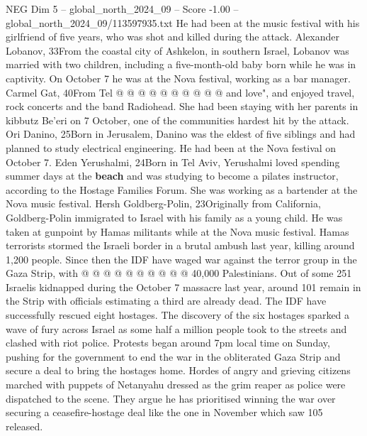 \begin{textsample}{NEG Dim 5 – global\_north\_2024\_09 – Score -1.00 – global\_north\_2024\_09/113597935.txt}
He had been at the music festival with his girlfriend of five years, who was shot and killed during the attack.
Alexander Lobanov, 33From the coastal city of Ashkelon, in southern Israel, Lobanov was married with two children, including a five-month-old baby born while he was in captivity.
On October 7 he was at the Nova festival, working as a bar manager.
Carmel Gat, 40From Tel @ @ @ @ @ @ @ @ @ @ and love", and enjoyed travel, rock concerts and the band Radiohead.
She had been staying with her parents in kibbutz Be'eri on 7 October, one of the communities hardest hit by the attack.
Ori Danino, 25Born in Jerusalem, Danino was the eldest of five siblings and had planned to study electrical engineering.
He had been at the Nova festival on October 7.
Eden Yerushalmi, 24Born in Tel Aviv, Yerushalmi loved spending summer days at the \textbf{beach} and was studying to become a pilates instructor, according to the Hostage Families Forum.
She was working as a bartender at the Nova music festival.
Hersh Goldberg-Polin, 23Originally from California, Goldberg-Polin immigrated to Israel with his family as a young child.
He was taken at gunpoint by Hamas militants while at the Nova music festival.
Hamas terrorists stormed the Israeli border in a brutal ambush last year, killing around 1,200 people.
Since then the IDF have waged war against the terror group in the Gaza Strip, with @ @ @ @ @ @ @ @ @ @ 40,000 Palestinians.
Out of some 251 Israelis kidnapped during the October 7 massacre last year, around 101 remain in the Strip with officials estimating a third are already dead.
The IDF have successfully rescued eight hostages.
The discovery of the six hostages sparked a wave of fury across Israel as some half a million people took to the streets and clashed with riot police.
Protests began around 7pm local time on Sunday, pushing for the government to end the war in the obliterated Gaza Strip and secure a deal to bring the hostages home.
Hordes of angry and grieving citizens marched with puppets of Netanyahu dressed as the grim reaper as police were dispatched to the scene.
They argue he has prioritised winning the war over securing a ceasefire-hostage deal like the one in November which saw 105 released.

\end{textsample}
